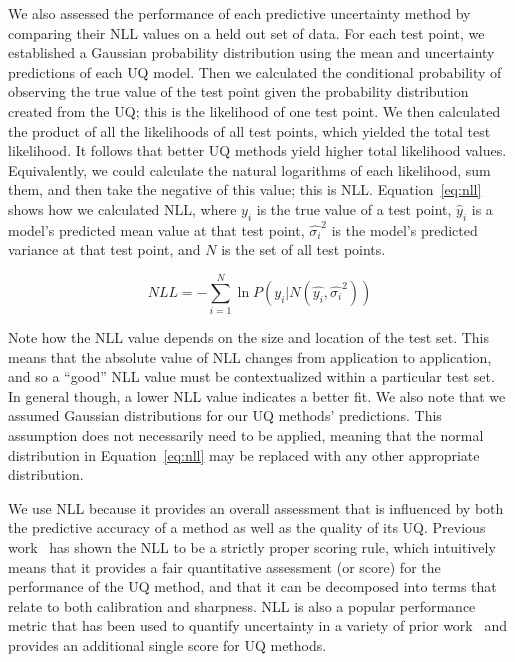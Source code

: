 \documentclass[]{achemso}
\begin{document}
We also assessed the performance of each predictive uncertainty method by comparing their \gls{NLL} values on a held out set of data.
For each test point, we established a Gaussian probability distribution using the mean and uncertainty predictions of each \gls{UQ} model.
Then we calculated the conditional probability of observing the true value of the test point given the probability distribution created from the \gls{UQ}; this is the likelihood of one test point.
We then calculated the product of all the likelihoods of all test points, which yielded the total test likelihood.
It follows that better \gls{UQ} methods yield higher total likelihood values.
Equivalently, we could calculate the natural logarithms of each likelihood, sum them, and then take the negative of this value; this is \gls{NLL}.
Equation~\ref{eq:nll} shows how we calculated \gls{NLL}, where $y_i$ is the true value of a test point, $\hat{y}_i$ is a model's predicted mean value at that test point, $\hat{\sigma_i}^2$ is the model's predicted variance at that test point, and $N$ is the set of all test points.

\begin{equation}\label{eq:nll}
    NLL = - \sum_{i=1}^{N} \ln{P(y_i | N(\hat{y_i}, \hat{\sigma_i}^2))}
\end{equation}

\noindent Note how the \gls{NLL} value depends on the size and location of the test set.
This means that the absolute value of \gls{NLL} changes from application to application, and so a ``good'' \gls{NLL} value must be contextualized within a particular test set.
In general though, a lower \gls{NLL} value indicates a better fit.
We also note that we assumed Gaussian distributions for our \gls{UQ} methods' predictions.
This assumption does not necessarily need to be applied, meaning that the normal distribution in Equation~\ref{eq:nll} may be replaced with any other appropriate distribution.

We use \gls{NLL} because it provides an overall assessment that is influenced by both the predictive accuracy of a method as well as the quality of its \gls{UQ}.
Previous work~\cite{Gneiting2007, Dawid2014} has shown the \gls{NLL} to be a strictly proper scoring rule, which intuitively means that it provides a fair quantitative assessment (or score) for the performance of the \gls{UQ} method, and that it can be decomposed into terms that relate to both calibration and sharpness.
\gls{NLL} is also a popular performance metric that has been used to quantify uncertainty in a variety of prior work~\cite{Lakshminarayanan2017} and provides an additional single score for \gls{UQ} methods.
\end{document}
